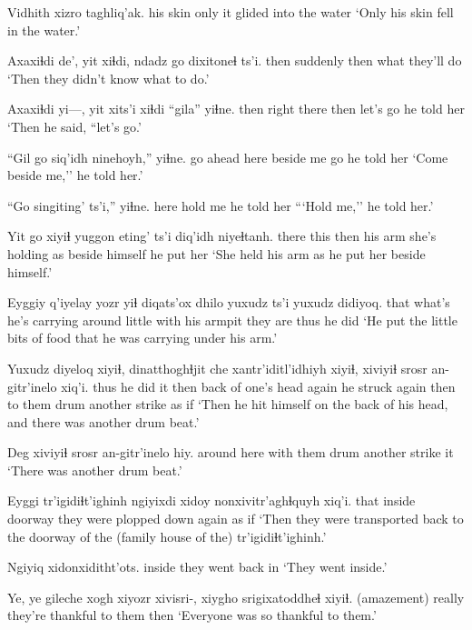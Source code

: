\documentclass[12pt]{article}
\begin{document}
\gll Vidhith  xizro taghliq'ak.
{his skin} only {it glided into the water}
\glt `Only his skin fell in the water.'
\glend

\gll Axaxiɬdi de', {yit xiɬdi,} {ndadz go} dixitoneɬ ts'i.
then     suddenly  then   what    {they'll do}
\glt `Then they didn't know what to do.' 
\glend

\gll Axaxiɬdi yi---, yit xits'i  xiɬdi ``gila'' yiɬne.
then {}     right there then  {let's go} {he told her}
\glt `Then he said, ``let's go.'
\glend

\gll ``Gil go    siq'idh   ninehoyh,'' yiɬne.
{go ahead} here {beside me} go     {he told her}
\glt `Come beside me,'' he told her.'
\glend

\gll ``Go   singiting' ts'i,'' yiɬne.
here {hold me}    {}  {he told her}
\glt ```Hold me,'' he told her.'
\glend

\gll Yit go   xiyiɬ yuggon eting'         ts'i diq'idh    niyeɬtanh. 
there this then   {his arm} {she's holding} as {beside himself} {he put her}
\glt `She held his arm as he put her beside himself.'
\glend

\gll Eyggiy q'iyelay                    yozr   yiɬ  diqats'ox  dhilo yuxudz ts'i yuxudz didiyoq.
that   {what's he's carrying around} little with {his armpit} {they are} thus {} {}  {he did}
\glt `He put the little bits of food that he was carrying under his arm.'
\glend

\gll Yuxudz diyeloq xiyiɬ, dinatthoghɬjit che    xantr'iditl'idhiyh xiyiɬ,  xiviyiɬ  srosr an-gitr'inelo xiq'i. 
thus {he did it} then {back of one's head} again {he struck again} then  {to them} drum  {another strike} {as if} 
\glt `Then he hit himself on the back of his head, and there was another drum beat.'
\glend

\gll Deg xiviyiɬ srosr an-gitr'inelo hiy.
{around here} {with them} drum {another strike} it
\glt `There was another drum beat.'
\glend

\gll Eyggi tr'igidiɬt'ighinh ngiyixdi xidoy  nonxivitr'aghɬquyh           xiq'i.
that   {}               inside  doorway {they were plopped down again} {as if}
\glt `Then they were transported back to the doorway of the (family house of the) tr'igidiɬt'ighinh.'
\glend

\gll Ngiyiq xidonxiditht'ots.
inside {they went back in}
\glt `They went inside.'
\glend

\gll Ye, ye gileche {xogh xiyozr} xivisri-, {xiygho srigixatoddheɬ} xiyiɬ.
{(amazement)} {} {}      really {}     {they're thankful to them} then
\glt `Everyone was so thankful to them.'
\glend
\end{document}
